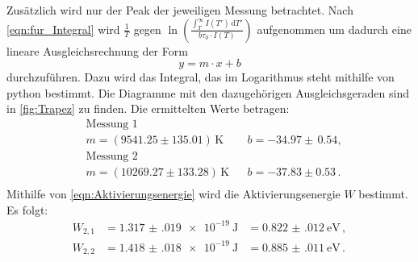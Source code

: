   \noindent
  Zusätzlich wird nur der Peak der jeweiligen Messung betrachtet.
  Nach \eqref{eqn:fur_Integral} wird $\frac{1}{T}$ gegen $\ln\left( \frac{\int_T^\infty I(T') \, \text{d}T'}{b \tau_0 \cdot I(T)}\right)$ aufgenommen um dadurch eine lineare Ausgleichsrechnung der Form
  \begin{equation*}
    y = m \cdot x + b 
  \end{equation*}
  durchzuführen.
  Dazu wird das Integral, das im Logarithmus steht mithilfe von python bestimmt.
  Die Diagramme mit den dazugehörigen Ausgleichsgeraden sind in \autoref{fig:Trapez} zu finden.
  Die ermittelten Werte betragen:
  \begin{align*}
    &\text{Messung 1} \\
    &m = (9541.25 \pm 135.01)\,\si{\kelvin} && b= -34.97 \pm  \, 0.54 , \\ 
    &\text{Messung 2} \\
    &m = (10269.27 \pm 133.28)\,\si{\kelvin} && b = -37.83 \pm 0.53\, . \\
  \end{align*}
  \noindent
  Mithilfe von \eqref{eqn:Aktivierungsenergie} wird die Aktivierungsenergie $W$ bestimmt.
  Es folgt:
  \begin{align*}
    W_{2,1} &= \SI{1.317(019)e-19}{\joule} &= \SI{0.822(012)}{\electronvolt} \, ,\\
    W_{2,2} &= \SI{1.418(018)e-19}{\joule} &= \SI{0.885(011)}{\electronvolt} \, .\\
  \end{align*}


